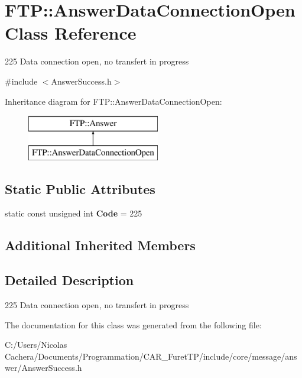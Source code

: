 \hypertarget{classFTP_1_1AnswerDataConnectionOpen}{}\section{F\+T\+P\+:\+:Answer\+Data\+Connection\+Open Class Reference}
\label{classFTP_1_1AnswerDataConnectionOpen}


225 Data connection open, no transfert in progress  




{\ttfamily \#include $<$Answer\+Success.\+h$>$}

Inheritance diagram for F\+T\+P\+:\+:Answer\+Data\+Connection\+Open\+:\begin{figure}[H]
\begin{center}
\leavevmode
\includegraphics[height=2.000000cm]{classFTP_1_1AnswerDataConnectionOpen}
\end{center}
\end{figure}
\subsection*{Static Public Attributes}
\begin{DoxyCompactItemize}
\item 
\hypertarget{classFTP_1_1AnswerDataConnectionOpen_a883697754f0cebfe3f8f6be47f6461c0}{}static const unsigned int {\bfseries Code} = 225\label{classFTP_1_1AnswerDataConnectionOpen_a883697754f0cebfe3f8f6be47f6461c0}

\end{DoxyCompactItemize}
\subsection*{Additional Inherited Members}


\subsection{Detailed Description}
225 Data connection open, no transfert in progress 

The documentation for this class was generated from the following file\+:\begin{DoxyCompactItemize}
\item 
C\+:/\+Users/\+Nicolas Cachera/\+Documents/\+Programmation/\+C\+A\+R\+\_\+\+Furet\+T\+P/include/core/message/answer/Answer\+Success.\+h\end{DoxyCompactItemize}
